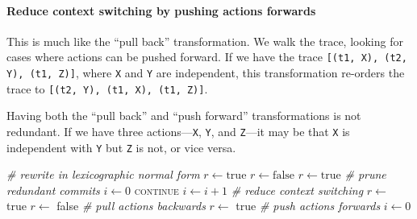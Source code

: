 \paragraph{Reduce context switching by pushing actions forwards}
This is much like the ``pull back'' transformation.  We walk the
trace, looking for cases where actions can be pushed forward.  If we
have the trace \verb|[(t1, X), (t2, Y), (t1, Z)]|, where \verb|X| and
\verb|Y| are independent, this transformation re-orders the trace to
\verb|[(t2, Y), (t1, X), (t1, Z)]|.

Having both the ``pull back'' and ``push forward'' transformations is
not redundant.  If we have three actions---\verb|X|, \verb|Y|, and
\verb|Z|---it may be that \verb|X| is independent with \verb|Y| but
\verb|Z| is not, or vice versa.

\begin{listing}
\centering
\begin{minipage}{\linewidth}
\begin{algorithmic}
  \State \textit{\# rewrite in lexicographic normal form}
  \State $r \gets \mathrm{true}$
    \State $r \gets \mathrm{false}$
        \State {}
        \State $r \gets \mathrm{true}$
      \EndIf
    \EndFor
  \EndWhile
  \State \textit{\# prune redundant commits}
  \State $i \gets 0$
        \State {}
        \State {}
        \State \textsc{continue}
      \EndIf
    \EndIf
    \State $i \gets i + 1$
  \EndWhile
  \State \textit{\# reduce context switching}
  \State $r \gets$ true
    \State $r \gets$ false
    \State \textit{\# pull actions backwards}
          \State {}
          \State $r \gets$ true
        \EndIf
      \EndIf
    \EndFor
    \State \textit{\# push actions forwards}
    \State $i \gets 0$

\end{algorithmic}
\end{minipage}
\end{listing}
